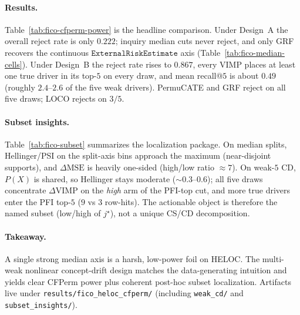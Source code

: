 \paragraph{Results.}
Table~\ref{tab:fico-cfperm-power} is the headline comparison.
Under Design~A the overall reject rate is only $0.222$; inquiry median cuts never
reject, and only GRF recovers the continuous $\mathtt{ExternalRiskEstimate}$ axis
(Table~\ref{tab:fico-median-cells}).
Under Design~B the reject rate rises to $0.867$, every VIMP places at least one
true driver in its top-$5$ on every draw, and mean recall@$5$ is about $0.49$
(roughly $2.4$--$2.6$ of the five weak drivers).
PermuCATE and GRF reject on all five draws; LOCO rejects on $3/5$.

\paragraph{Subset insights.}
Table~\ref{tab:fico-subset} summarizes the localization package.
On median splits, Hellinger/PSI on the split-axis bins approach the maximum
(near-disjoint supports), and $\Delta\mathrm{MSE}$ is heavily one-sided
(high/low ratio $\approx 7$).
On weak-$5$ CD, $P(X)$ is shared, so Hellinger stays moderate ($\sim 0.3$--$0.6$);
all five draws concentrate $\Delta\mathrm{VIMP}$ on the \emph{high} arm of the
PFI-top cut, and more true drivers enter the PFI top-$5$ ($9$ vs $3$ row-hits).
The actionable object is therefore the named subset (low/high of $j^\star$), not a
unique CS/CD decomposition.

\paragraph{Takeaway.}
A single strong median axis is a harsh, low-power foil on HELOC.
The multi-weak nonlinear concept-drift design matches the data-generating intuition
and yields clear CFPerm power plus coherent post-hoc subset localization.
Artifacts live under \texttt{results/fico\_heloc\_cfperm/}
(including \texttt{weak\_cd/} and \texttt{subset\_insights/}).
